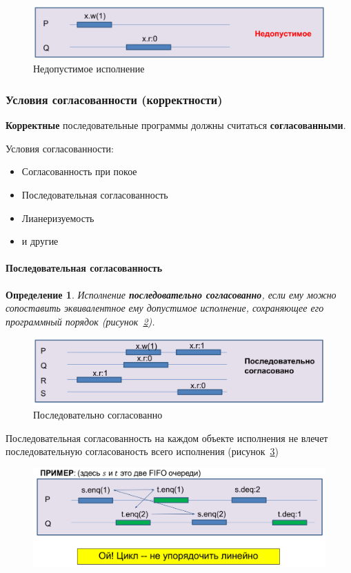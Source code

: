 \documentclass[10pt,a4paper,oneside,titlepage]{article}
\theoremstyle{plain}
\theoremstyle{defenition}
\newtheorem*{defenition}{Определение}
\begin{document}
\begin{figure}[h!]
	\centering
	\includegraphics[width=0.5\linewidth]{pictures/Model8}
	\caption{Недопустимое исполнение}
	\label{fig:model8}
\end{figure}

\subsubsection{Условия согласованности (корректности)}
{\bfseries Корректные} последовательные программы должны считаться {\bfseries согласованными}.

Условия согласованности:
\begin{itemize}
	\item Согласованность при покое
	\item Последовательная согласованность
	\item Лианеризуемость
	\item и другие
\end{itemize}

\paragraph{Последовательная согласованность}
\begin{defenition}
	Исполнение {\bfseries последовательно согласованно}, если ему можно сопоставить эквивалентное ему допустимое исполнение, сохраняющее его программный порядок (рисунок~\ref{fig:model9}).
\end{defenition}

\begin{figure}[h!]
	\centering
	\includegraphics[width=0.5\linewidth]{pictures/Model9}
	\caption{Последовательно согласованно}
	\label{fig:model9}
\end{figure}

Последовательная согласованность на каждом объекте исполнения не влечет последовательную согласованость всего исполнения (рисунок~\ref{fig:model10})

\begin{figure}[h!]
	\centering
	\includegraphics[width=0.7\linewidth]{pictures/Model10}
	\caption{}
	\label{fig:model10}
\end{figure}
\end{document}
